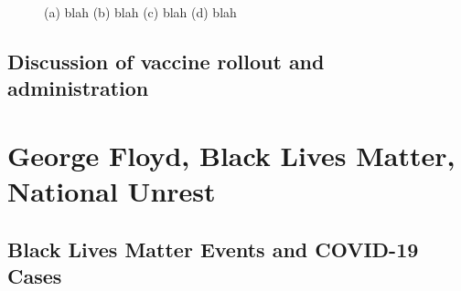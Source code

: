 \documentclass[]{article}
\begin{document}
\begin{figure}
	\caption{(a) blah (b) blah (c) blah (d) blah}
	\label{fig:foobar}
\end{figure}
\FloatBarrier
\vspace{5mm}

\subsection{Discussion of vaccine rollout and administration}

\vspace{5mm}

\section{George Floyd, Black Lives Matter, National Unrest}


\subsection{Black Lives Matter Events and COVID-19 Cases}
\end{document}
